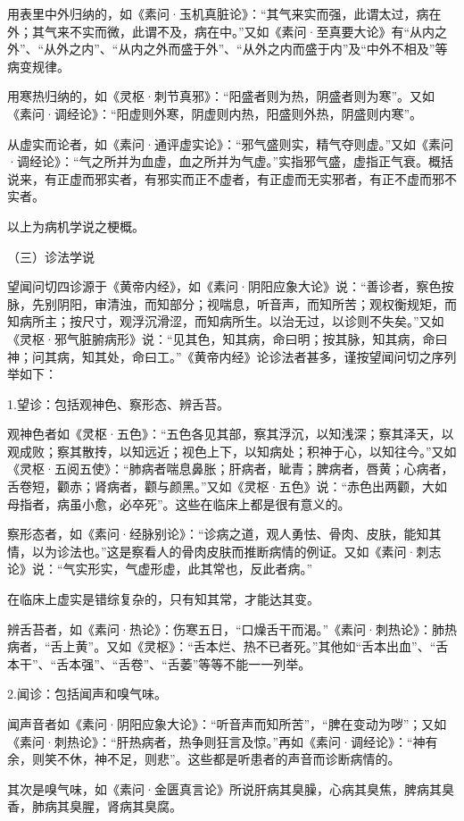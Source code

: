 \documentclass[a4paper,12pt,UTF8,twoside]{ctexbook}
\begin{document}
用表里中外归纳的，如《素问·玉机真脏论》：“其气来实而强，此谓太过，病在外；其气来不实而微，此谓不及，病在中。”又如《素问·至真要大论》有“从内之外”、“从外之内”、“从内之外而盛于外”、“从外之内而盛于内”及“中外不相及”等病变规律。

用寒热归纳的，如《灵枢·刺节真邪》：“阳盛者则为热，阴盛者则为寒”。又如《素问·调经论》：“阳虚则外寒，阴虚则内热，阳盛则外热，阴盛则内寒”。

从虚实而论者，如《素问·通评虚实论》：“邪气盛则实，精气夺则虚。”又如《素问·调经论》：“气之所并为血虚，血之所并为气虚。”实指邪气盛，虚指正气衰。概括说来，有正虚而邪实者，有邪实而正不虚者，有正虚而无实邪者，有正不虚而邪不实者。

以上为病机学说之梗概。

（三）诊法学说

望闻问切四诊源于《黄帝内经》，如《素问·阴阳应象大论》说：“善诊者，察色按脉，先别阴阳，审清浊，而知部分；视喘息，听音声，而知所苦；观权衡规矩，而知病所主；按尺寸，观浮沉滑涩，而知病所生。以治无过，以诊则不失矣。”又如《灵枢·邪气脏腑病形》说：“见其色，知其病，命曰明；按其脉，知其病，命曰神；问其病，知其处，命曰工。”《黄帝内经》论诊法者甚多，谨按望闻问切之序列举如下：

1.望诊：包括观神色、察形态、辨舌苔。

观神色者如《灵枢·五色》：“五色各见其部，察其浮沉，以知浅深；察其泽天，以观成败；察其散抟，以知远近；视色上下，以知病处；积神于心，以知往今。”又如《灵枢·五阅五使》：“肺病者喘息鼻胀；肝病者，眦青；脾病者，唇黄；心病者，舌卷短，颧赤；肾病者，颧与颜黑。”又如《灵枢·五色》说：“赤色出两颧，大如母指者，病虽小愈，必卒死”。这些在临床上都是很有意义的。

察形态者，如《素问·经脉别论》：“诊病之道，观人勇怯、骨肉、皮肤，能知其情，以为诊法也。”这是察看人的骨肉皮肤而推断病情的例证。又如《素问·刺志论》说：“气实形实，气虚形虚，此其常也，反此者病。”

在临床上虚实是错综复杂的，只有知其常，才能达其变。

辨舌苔者，如《素问·热论》：伤寒五日，“口燥舌干而渴。”《素问·刺热论》：肺热病者，“舌上黄”。又如《灵枢》：“舌本烂、热不已者死。”其他如“舌本出血”、“舌本干”、“舌本强”、“舌卷”、“舌萎”等等不能一一列举。

2.闻诊：包括闻声和嗅气味。

闻声音者如《素问·阴阳应象大论》：“听音声而知所苦”，“脾在变动为哕”；又如《素问·刺热论》：“肝热病者，热争则狂言及惊。”再如《素问·调经论》：“神有余，则笑不休，神不足，则悲”。这些都是听患者的声音而诊断病情的。

其次是嗅气味，如《素问·金匮真言论》所说肝病其臭臊，心病其臭焦，脾病其臭香，肺病其臭腥，肾病其臭腐。
\end{document}
